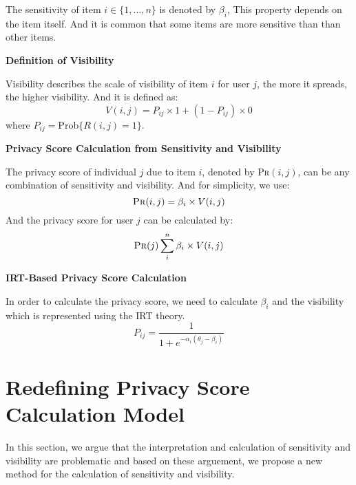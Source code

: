 \documentclass[a4paper]{article}
\begin{document}
The sensitivity of item $i\in \{1,\ldots,n\}$ is denoted by $\beta_i$,
This property depends on the item itself. And it is common that some
items are more sensitive than than other items. 

\textbf{Definition of Visibility}

Visibility describes the scale of visibility of item $i$ for user $j$,
the more it spreads, the higher visibility. And it is defined as: 
\begin{equation}
\label{equ:org:visibility}
V(i,j) = P_{ij}\times 1 + (1-P_{ij})\times 0
\end{equation}
where $P_{ij}=$Prob$\{R(i,j)=1\}$.

\textbf{Privacy Score Calculation from Sensitivity and Visibility}

The privacy score of individual $j$ due to item $i$, denoted by
\textsc{Pr}$(i, j)$, can be any combination of sensitivity and
visibility. And for simplicity, we use: 
\[
\textsc{Pr}(i,j)=\beta_i\times V(i,j)
\]
And the privacy score for user $j$ can be calculated by: 
\begin{equation}
\label{equ:org:pscore}
\textsc{Pr}(j) \sum_i^n\beta_i\times V(i,j)
\end{equation}

\textbf{IRT-Based Privacy Score Calculation}

In order to calculate the privacy score, we need to calculate
$\beta_i$ and the visibility which is represented using the IRT
theory. 
\begin{equation}
\label{equ:org:irt}
P_{ij}=\frac{1}{1+e^{-\alpha_i(\theta_j-\beta_i)}}
\end{equation}

\section{Redefining Privacy Score Calculation Model \label{sec:redefine}}
In this section, we argue that the interpretation and calculation of
sensitivity and visibility are problematic and based on these
arguement, we propose a new method for the calculation of sensitivity
and visibility.
\end{document}

